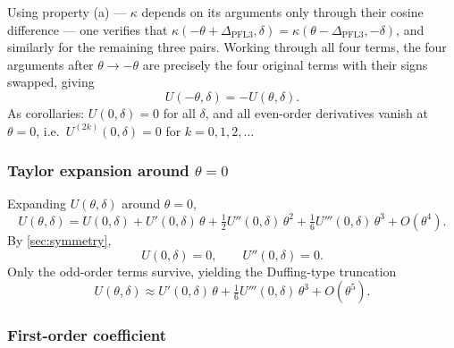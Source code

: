 \documentclass[11pt, a4paper]{article}
\newcommand{\Dp}{\Delta_{\mathrm{PFL3}}}
\begin{document}
Using property (a) --- $\kappa$ depends on its arguments only through their
cosine difference --- one verifies that $\kappa(-\theta + \Dp, \delta)
= \kappa(\theta - \Dp, -\delta)$, and similarly for the remaining three pairs.
Working through all four terms, the four arguments after $\theta \to -\theta$
are precisely the four original terms with their signs swapped, giving
%
\begin{equation}
\label{eq:U-odd}
U(-\theta, \delta) = -U(\theta, \delta).
\end{equation}
%
As corollaries: $U(0, \delta) = 0$ for all $\delta$, and all even-order
derivatives vanish at $\theta = 0$, i.e.\ $U^{(2k)}(0, \delta) = 0$ for
$k = 0, 1, 2, \ldots$

\subsubsection{Taylor expansion around \texorpdfstring{$\theta = 0$}{theta=0}}
\label{sec:taylor-expansion}

Expanding $U(\theta, \delta)$ around $\theta = 0$,
%
\begin{equation}
\label{eq:taylor-full}
U(\theta, \delta)
  = U(0,\delta)
  + U'(0,\delta)\,\theta
  + \tfrac{1}{2}U''(0,\delta)\,\theta^2
  + \tfrac{1}{6}U'''(0,\delta)\,\theta^3
  + O(\theta^4).
\tag{11}
\end{equation}
%
By \cref{sec:symmetry},
%
\begin{equation}
\label{eq:even-vanish}
U(0, \delta) = 0, \qquad U''(0, \delta) = 0.
\tag{12}
\end{equation}
%
Only the odd-order terms survive, yielding the Duffing-type truncation
%
\begin{equation}
\label{eq:duffing-form-firstorder}
U(\theta, \delta) \approx U'(0,\delta)\,\theta
                        + \tfrac{1}{6}U'''(0,\delta)\,\theta^3
                        + O(\theta^5).
\end{equation}

\subsubsection{First-order coefficient}
\label{sec:A-coeff}
\end{document}
